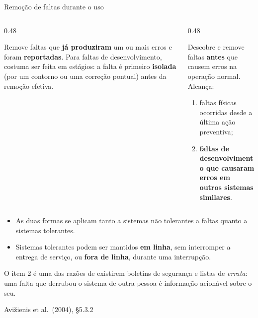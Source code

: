 \documentclass{beamer}
\newcommand{\sect}[1]{\par\smallskip\hfill{\tiny\color{black!55}Avi\v{z}ienis et al.\ (2004), #1}}
\begin{document}
\begin{frame}{Remo\c{c}\~ao de faltas durante o uso}
    \footnotesize
    \begin{columns}[T]
        \begin{column}{0.48\textwidth}
            \begin{tcolorbox}[colback=depAzul!6,colframe=depAzul!60,boxrule=0.6pt,title={\scriptsize\bfseries Manuten\c{c}\~ao corretiva}]
                \scriptsize
                Remove faltas que \textbf{j\'a produziram} um ou mais erros e foram \textbf{reportadas}.
                \smallskip
                Para faltas de desenvolvimento, costuma ser feita em est\'agios: a falta \'e primeiro \textbf{isolada} (por um contorno ou uma corre\c{c}\~ao pontual) antes da remo\c{c}\~ao efetiva.
            \end{tcolorbox}
        \end{column}
        \begin{column}{0.48\textwidth}
            \begin{tcolorbox}[colback=depVerde!6,colframe=depVerde!60,boxrule=0.6pt,title={\scriptsize\bfseries Manuten\c{c}\~ao preventiva}]
                \scriptsize
                Descobre e remove faltas \textbf{antes} que causem erros na opera\c{c}\~ao normal. Alcan\c{c}a:
                \begin{enumerate}
                    \item faltas f\'isicas ocorridas desde a \'ultima a\c{c}\~ao preventiva;
                    \item \textbf{faltas de desenvolvimento que causaram erros em outros sistemas similares}.
                \end{enumerate}
            \end{tcolorbox}
        \end{column}
    \end{columns}
    \medskip
    \begin{itemize}
        \item As duas formas se aplicam tanto a sistemas n\~ao tolerantes a faltas quanto a sistemas tolerantes.
        \item Sistemas tolerantes podem ser mantidos \textbf{em linha}, sem interromper a entrega de servi\c{c}o, ou \textbf{fora de linha}, durante uma interrup\c{c}\~ao.
    \end{itemize}
    \medskip
    \begin{ancora}
        \footnotesize
        O item 2 \'e uma das raz\~oes de existirem boletins de seguran\c{c}a e listas de \textit{errata}: uma falta que derrubou o sistema de outra pessoa \'e informa\c{c}\~ao acion\'avel sobre o seu.
    \end{ancora}
    \sect{\S5.3.2}
\end{frame}
\end{document}
